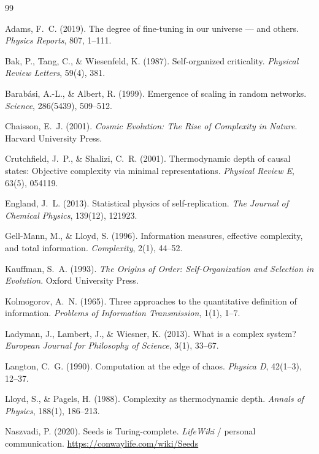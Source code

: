 \documentclass[12pt,a4paper]{article}
\begin{document}
\begin{thebibliography}{99}

Adams, F.~C. (2019).
The degree of fine-tuning in our universe --- and others.
\textit{Physics Reports}, 807, 1--111.

Bak, P., Tang, C., \& Wiesenfeld, K. (1987).
Self-organized criticality.
\textit{Physical Review Letters}, 59(4), 381.

Barab{\'a}si, A.-L., \& Albert, R. (1999).
Emergence of scaling in random networks.
\textit{Science}, 286(5439), 509--512.

Chaisson, E.~J. (2001).
\textit{Cosmic Evolution: The Rise of Complexity in Nature}.
Harvard University Press.

Crutchfield, J.~P., \& Shalizi, C.~R. (2001).
Thermodynamic depth of causal states: Objective complexity via minimal
representations.
\textit{Physical Review E}, 63(5), 054119.

England, J.~L. (2013).
Statistical physics of self-replication.
\textit{The Journal of Chemical Physics}, 139(12), 121923.

Gell-Mann, M., \& Lloyd, S. (1996).
Information measures, effective complexity, and total information.
\textit{Complexity}, 2(1), 44--52.

Kauffman, S.~A. (1993).
\textit{The Origins of Order: Self-Organization and Selection in Evolution}.
Oxford University Press.

Kolmogorov, A.~N. (1965).
Three approaches to the quantitative definition of information.
\textit{Problems of Information Transmission}, 1(1), 1--7.

Ladyman, J., Lambert, J., \& Wiesner, K. (2013).
What is a complex system?
\textit{European Journal for Philosophy of Science}, 3(1), 33--67.

Langton, C.~G. (1990).
Computation at the edge of chaos.
\textit{Physica D}, 42(1--3), 12--37.

Lloyd, S., \& Pagels, H. (1988).
Complexity as thermodynamic depth.
\textit{Annals of Physics}, 188(1), 186--213.

Naszvadi, P. (2020).
Seeds is Turing-complete.
\textit{LifeWiki} / personal communication.
\url{https://conwaylife.com/wiki/Seeds}


\end{thebibliography}
\end{document}
